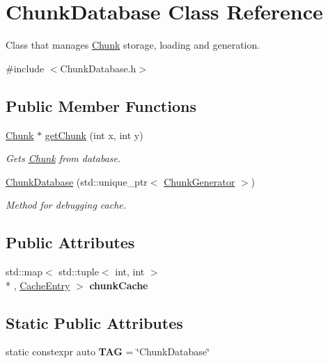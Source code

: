 \hypertarget{classChunkDatabase}{\section{Chunk\-Database Class Reference}
\label{classChunkDatabase}
}


Class that manages \hyperlink{classChunk}{Chunk} storage, loading and generation.  




{\ttfamily \#include $<$Chunk\-Database.\-h$>$}

\subsection*{Public Member Functions}
\begin{DoxyCompactItemize}
\item 
\hyperlink{classChunk}{Chunk} $\ast$ \hyperlink{classChunkDatabase_abcf683d90bbfc79651f0ccc377037c64}{get\-Chunk} (int x, int y)
\begin{DoxyCompactList}\small\item\em Gets \hyperlink{classChunk}{Chunk} from database. \end{DoxyCompactList}\item 
\hyperlink{classChunkDatabase_ac679a24342adcd98d02c3318882651e4}{Chunk\-Database} (std\-::unique\-\_\-ptr$<$ \hyperlink{classChunkGenerator}{Chunk\-Generator} $>$)
\begin{DoxyCompactList}\small\item\em Method for debugging cache. \end{DoxyCompactList}\end{DoxyCompactItemize}
\subsection*{Public Attributes}
\begin{DoxyCompactItemize}
\item 
\hypertarget{classChunkDatabase_ad017d1f92ddf17b747a1ecc88e7343ad}{std\-::map$<$ std\-::tuple$<$ int, int $>$\\*
, \hyperlink{structCacheEntry}{Cache\-Entry} $>$ {\bfseries chunk\-Cache}}\label{classChunkDatabase_ad017d1f92ddf17b747a1ecc88e7343ad}

\end{DoxyCompactItemize}
\subsection*{Static Public Attributes}
\begin{DoxyCompactItemize}
\item 
\hypertarget{classChunkDatabase_adb967e0a364d2e64dea766df6fd00720}{static constexpr auto {\bfseries T\-A\-G} = \char`\"{}Chunk\-Database\char`\"{}}\label{classChunkDatabase_adb967e0a364d2e64dea766df6fd00720}

\end{DoxyCompactItemize}


